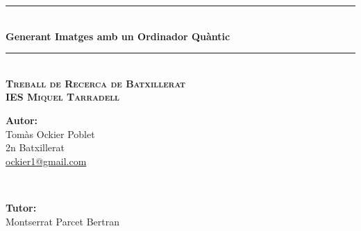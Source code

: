 \documentclass[a4paper,12pt,arial,numbered,print,index,oneside]{book}
\newcommand{\HRule}{\rule{\linewidth}{0.5mm}} %
\begin{document}
	\begin{titlepage}
		
		\begin{center}
		\begin{singlespace}%
		

		
		\HRule \\[0.4cm]
		{ \Huge \bfseries Generant Imatges amb un Ordinador Quàntic}\\[0.1cm] 
		\HRule \\[1.2cm]
		
		\textsc{\Large \textbf{Treball de Recerca de Batxillerat}}\\[.5cm]
		
		\textsc{\large \textbf{IES Miquel Tarradell}}\\[2cm]
		
		
		\vspace{8.5cm}
		\begin{minipage}{0.48\textwidth}
			\begin{flushleft} \large
				\Large \textbf{Autor:}\\
				\Large Tomàs Ockier Poblet \\ 2n Batxillerat \\ \href{mailto:ockier1@gmail.com}{ockier1@gmail.com}
			\end{flushleft}
		\end{minipage}
		~
		\begin{minipage}{0.48\textwidth}
			\begin{flushright} \large
				\Large \textbf{Tutor:} \\
				\Large Montserrat Parcet Bertran 
			\end{flushright}
		\end{minipage}\\
		
		

\end{singlespace}
\end{center}
\end{titlepage}
\end{document}
